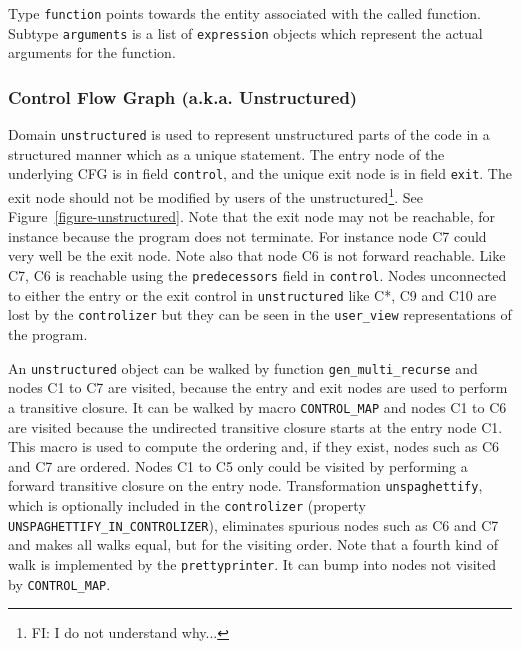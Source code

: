 \documentclass[a4paper]{article}
\begin{document}
Type \verb/function/ points towards the entity associated with the
called function. Subtype \verb/arguments/ is a list of \verb/expression/
objects which represent the actual arguments for the function.

\begin{comment}
Le sous-domaine \verb/function/ est une entit� qui d�finit la fonction
appel�e. Le sous-domaine \verb/arguments/ est une liste de sous-domaines
\verb/expression/ qui repr�sente les arguments d'appel de la fonction.
\end{comment}


\subsubsection{Control Flow Graph (a.k.a. Unstructured)}
\label{subsubsection-unstructured}

{}

Domain \verb/unstructured/ is used to represent unstructured parts of
the code in a structured manner which as a unique statement. The entry
node of the underlying CFG is in field \verb/control/, and the
unique exit node is in field \verb/exit/. The exit node should not be
modified by users of the unstructured\footnote{FI: I do not understand
why...}.  See Figure~\ref{figure-unstructured}. Note that the exit node
may not be reachable, for instance because the program does not terminate. For instance node C7 could very well be the exit
node. Note also that node C6 is not forward reachable. Like C7, C6 is
reachable using the \verb+predecessors+ field in
\verb+control+. Nodes unconnected to either the entry or the exit
control in \verb+unstructured+ like C*, C9 and C10 are lost by the
\verb+controlizer+ but they can be seen in the \verb+user_view+
representations of the program.

An \verb+unstructured+ object can be walked by function
\verb+gen_multi_recurse+ and nodes C1 to C7 are visited, because the entry
and exit nodes are used to perform a transitive closure. It can be walked
by macro \verb+CONTROL_MAP+ and nodes C1 to C6 are visited because the
undirected transitive closure starts at the entry node C1. This macro is
used to compute the ordering and, if they exist, nodes such as C6 and C7
are ordered. Nodes C1 to C5 only could be visited by performing a forward
transitive closure on the entry node. Transformation \verb+unspaghettify+,
which is optionally included in the \verb+controlizer+ (property
\verb/UNSPAGHETTIFY_IN_CONTROLIZER/), eliminates spurious nodes such as C6
and C7 and makes all walks equal, but for the visiting order. Note that a
fourth kind of walk is implemented by the \verb+prettyprinter+. It can
bump into nodes not visited by \verb+CONTROL_MAP+.
\end{document}
